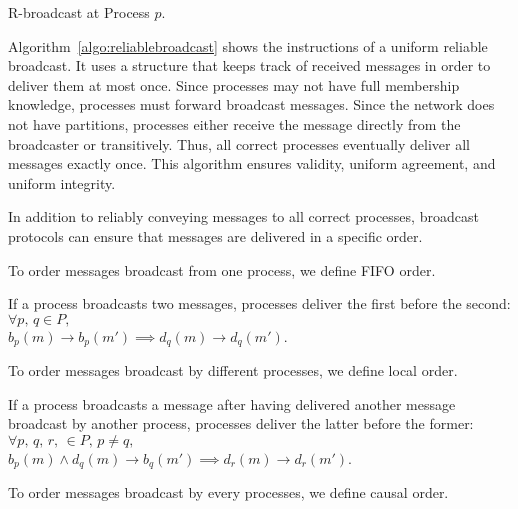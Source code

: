 \begin{algorithm}[h]
  
  \caption{\label{algo:reliablebroadcast}R-broadcast at Process $p$.}
\end{algorithm}

Algorithm~\ref{algo:reliablebroadcast} shows the instructions of a uniform
reliable broadcast. It uses a structure that keeps track of received messages in
order to deliver them at most once. 
Since processes may not have full membership knowledge, processes must forward
broadcast messages. Since the network does not have partitions, processes either
receive the message directly from the broadcaster or transitively. Thus, all
correct processes eventually deliver all messages exactly once. This algorithm
ensures validity, uniform agreement, and uniform integrity.

In addition to reliably conveying messages to all correct processes, broadcast
protocols can ensure that messages are delivered in a specific order.

To order messages broadcast from one process, we define FIFO order.

\begin{definition}
  If a process broadcasts two messages, processes deliver the first before the
  second:\\
  $\forall p,\,q \in P,\,$\\$b_p(m) \rightarrow b_p(m') \implies d_q(m) \rightarrow
  d_q(m')$.
\end{definition}

To order messages broadcast by different processes, we define local order.

\begin{definition}
  If a process broadcasts a message after having delivered another message
  broadcast by another process, processes deliver the latter before the former:\\
  $\forall p,\,q,\,r,\, \in P,\,p\neq q,\,$\\$b_p(m) \wedge d_q(m) \rightarrow b_q(m') \implies d_r(m) \rightarrow d_r(m')$.
\end{definition}

To order messages broadcast by every processes, we define causal order.

